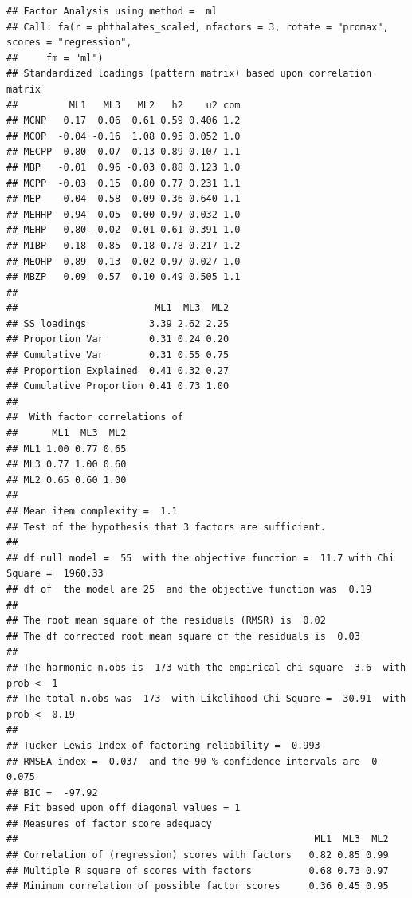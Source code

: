 \documentclass[
]{article}
\newenvironment{Shaded}{\begin{snugshade}}{\end{snugshade}}
\newcommand{\AttributeTok}[1]{\textcolor[rgb]{0.13,0.29,0.53}{#1}}
\newcommand{\FloatTok}[1]{\textcolor[rgb]{0.00,0.00,0.81}{#1}}
\newcommand{\FunctionTok}[1]{\textcolor[rgb]{0.13,0.29,0.53}{\textbf{#1}}}
\newcommand{\NormalTok}[1]{#1}
\newcommand{\SpecialCharTok}[1]{\textcolor[rgb]{0.81,0.36,0.00}{\textbf{#1}}}
\begin{document}
\begin{verbatim}
## Factor Analysis using method =  ml
## Call: fa(r = phthalates_scaled, nfactors = 3, rotate = "promax", scores = "regression", 
##     fm = "ml")
## Standardized loadings (pattern matrix) based upon correlation matrix
##         ML1   ML3   ML2   h2    u2 com
## MCNP   0.17  0.06  0.61 0.59 0.406 1.2
## MCOP  -0.04 -0.16  1.08 0.95 0.052 1.0
## MECPP  0.80  0.07  0.13 0.89 0.107 1.1
## MBP   -0.01  0.96 -0.03 0.88 0.123 1.0
## MCPP  -0.03  0.15  0.80 0.77 0.231 1.1
## MEP   -0.04  0.58  0.09 0.36 0.640 1.1
## MEHHP  0.94  0.05  0.00 0.97 0.032 1.0
## MEHP   0.80 -0.02 -0.01 0.61 0.391 1.0
## MIBP   0.18  0.85 -0.18 0.78 0.217 1.2
## MEOHP  0.89  0.13 -0.02 0.97 0.027 1.0
## MBZP   0.09  0.57  0.10 0.49 0.505 1.1
## 
##                        ML1  ML3  ML2
## SS loadings           3.39 2.62 2.25
## Proportion Var        0.31 0.24 0.20
## Cumulative Var        0.31 0.55 0.75
## Proportion Explained  0.41 0.32 0.27
## Cumulative Proportion 0.41 0.73 1.00
## 
##  With factor correlations of 
##      ML1  ML3  ML2
## ML1 1.00 0.77 0.65
## ML3 0.77 1.00 0.60
## ML2 0.65 0.60 1.00
## 
## Mean item complexity =  1.1
## Test of the hypothesis that 3 factors are sufficient.
## 
## df null model =  55  with the objective function =  11.7 with Chi Square =  1960.33
## df of  the model are 25  and the objective function was  0.19 
## 
## The root mean square of the residuals (RMSR) is  0.02 
## The df corrected root mean square of the residuals is  0.03 
## 
## The harmonic n.obs is  173 with the empirical chi square  3.6  with prob <  1 
## The total n.obs was  173  with Likelihood Chi Square =  30.91  with prob <  0.19 
## 
## Tucker Lewis Index of factoring reliability =  0.993
## RMSEA index =  0.037  and the 90 % confidence intervals are  0 0.075
## BIC =  -97.92
## Fit based upon off diagonal values = 1
## Measures of factor score adequacy             
##                                                    ML1  ML3  ML2
## Correlation of (regression) scores with factors   0.82 0.85 0.99
## Multiple R square of scores with factors          0.68 0.73 0.97
## Minimum correlation of possible factor scores     0.36 0.45 0.95
\end{verbatim}

\begin{Shaded}
\end{Shaded}
\end{document}

